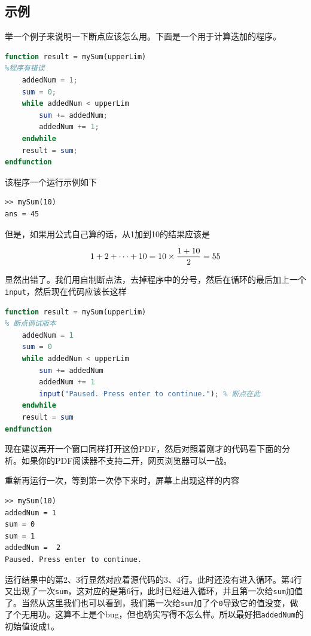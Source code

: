 \documentclass[12pt]{article}
\begin{document}
\begin{spacing}{1.4}
\subsection{示例}

举一个例子来说明一下断点应该怎么用。下面是一个用于计算迭加的程序。

\begin{lstlisting}[language=octave]
function result = mySum(upperLim)
%程序有错误
    addedNum = 1;
    sum = 0;
    while addedNum < upperLim
        sum += addedNum;
        addedNum += 1;
    endwhile
    result = sum;
endfunction
\end{lstlisting}

该程序一个运行示例如下

\begin{lstlisting}
>> mySum(10)
ans = 45
\end{lstlisting}

但是，如果用公式自己算的话，从1加到10的结果应该是

\[ \rm{ 1 + 2 + \cdots + 10  = 10 \times \frac{1 + 10}{2} = 55 } \]

显然出错了。我们用自制断点法，去掉程序中的分号，然后在循环的最后加上一个\texttt{input}，然后现在代码应该长这样

\begin{lstlisting}[language=octave]
function result = mySum(upperLim)
% 断点调试版本
    addedNum = 1
    sum = 0
    while addedNum < upperLim
        sum += addedNum
        addedNum += 1
        input("Paused. Press enter to continue."); % 断点在此
    endwhile
    result = sum
endfunction
\end{lstlisting}

现在建议再开一个窗口同样打开这份PDF，然后对照着刚才的代码看下面的分析。如果你的PDF阅读器不支持二开，网页浏览器可以一战。

重新再运行一次，等到第一次停下来时，屏幕上出现这样的内容

\begin{lstlisting}
>> mySum(10)
addedNum = 1
sum = 0
sum = 1
addedNum =  2
Paused. Press enter to continue.
\end{lstlisting}

运行结果中的第2、3行显然对应着源代码的3、4行。此时还没有进入循环。第4行又出现了一次\texttt{sum}，这对应的是第6行，此时已经进入循环，并且第一次给\texttt{sum}加值了。当然从这里我们也可以看到，我们第一次给\texttt{sum}加了个\texttt{0}导致它的值没变，做了个无用功。这算不上是个bug，但也确实写得不怎么样。所以最好把\texttt{addedNum}的初始值设成1。


\end{spacing}
\end{document}
